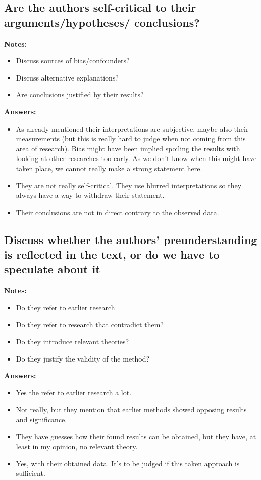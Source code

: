 \documentclass[11pt]{scrartcl}
\begin{document}
\bigbreak

\subsection{Are the authors self-critical to their arguments/hypotheses/ conclusions?}

\textbf{Notes:}
\begin{itemize}
  \item Discuss sources of bias/confounders?
  \item Discuss alternative explanations?
  \item Are conclusions justified by their results?
\end{itemize}


\textbf{Answers:}
\begin{itemize}
  \item As already mentioned their interpretations are subjective, maybe also their measurements (but this is really hard to judge when not coming from this area of research). Bias might have been implied spoiling the results with looking at other researches too early. As we don't know when this might have taken place, we cannot really make a strong statement here.
  \item They are not really self-critical. They use blurred interpretations so they always have a way to withdraw their statement.
  \item Their conclusions are not in direct contrary to the observed data.
\end{itemize}

\bigbreak

\subsection{Discuss whether the authors’ preunderstanding is reflected in the text, or do we have to speculate about it}

\textbf{Notes:}
\begin{itemize}
  \item Do they refer to earlier research
  \item Do they refer to research that contradict them?
  \item Do they introduce relevant theories?
  \item Do they justify the validity of the method?
\end{itemize}

\textbf{Answers:}
\begin{itemize}
  \item Yes the refer to earlier research a lot.
  \item Not really, but they mention that earlier methods showed opposing results and significance.
  \item They have guesses how their found results can be obtained, but they have, at least in my opinion, no relevant theory.
  \item Yes, with their obtained data. It's to be judged if this taken approach is sufficient.
\end{itemize}

\bigbreak
\end{document}
